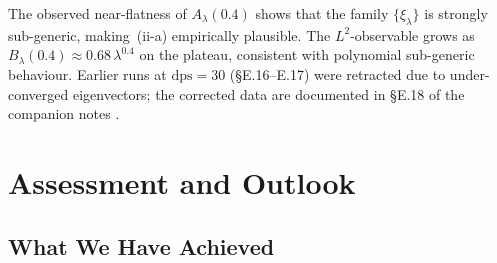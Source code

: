 \documentclass[12pt,a4paper]{article}
\theoremstyle{definition}
\theoremstyle{remark}
\begin{document}
The observed near-flatness of $A_\lambda(0.4)$ shows that the family $\{\hat\xi_\lambda\}$ is
strongly sub-generic, making~(ii-a) empirically plausible.
The $L^2$-observable grows as $B_\lambda(0.4) \approx 0.68\,\lambda^{0.4}$ on the plateau,
consistent with polynomial sub-generic behaviour.
Earlier runs at $\mathrm{dps}=30$ (\S E.16--E.17) were retracted due to
under-converged eigenvectors; the corrected data are documented in \S E.18
of the companion notes \cite{Geiger2026evendom}.


\section{Assessment and Outlook}
\label{sec:outlook}

\subsection{What We Have Achieved}
\end{document}
